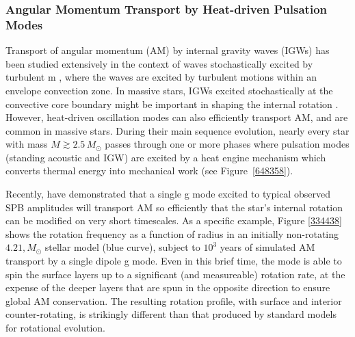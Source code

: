 
\subsubsection{Angular Momentum Transport by Heat-driven Pulsation Modes}

Transport of angular momentum (AM) by internal gravity waves (IGWs) has been studied extensively in the context of waves stochastically excited by turbulent m \citep[e.g.,][]{Schatzman:1993,Kumar:1997,Zahn:1997,Talon:2002,Talon:2005,Rogers:2008aa}, where the waves are excited by turbulent motions within an envelope convection zone. In massive stars, IGWs excited stochastically at the convective core boundary might be important in shaping the internal rotation \citep[e.g.][]{Rogers:2013,Lee:2014,Rogers:2015}. However, heat-driven oscillation modes can also efficiently transport AM, and are common in massive stars. During their main sequence evolution, nearly every star with mass $M \gtrsim 2.5\,M_{\odot}$ passes through one or more phases where pulsation modes (standing acoustic and IGW) are excited by a heat engine mechanism which converts thermal energy into mechanical work (see Figure~\ref{648358}).


Recently, \citet{Townsend:2017} have demonstrated that a single g mode excited to typical observed SPB amplitudes will transport AM so efficiently that the star's internal rotation can be modified on very short timescales. As a specific example, Figure \ref{334438} shows the rotation frequency as a function of radius in an initially non-rotating $4.21,M_{\odot}$ stellar model (blue curve), subject to $10^3$ years of simulated AM transport by a single dipole g mode. Even in this brief time, the mode is able to spin the surface layers up to a significant (and measureable) rotation rate, at the expense of the deeper layers that are spun in the opposite direction to ensure global AM conservation. The resulting rotation profile, with surface and interior counter-rotating, is strikingly different than that produced by standard models for rotational evolution.


